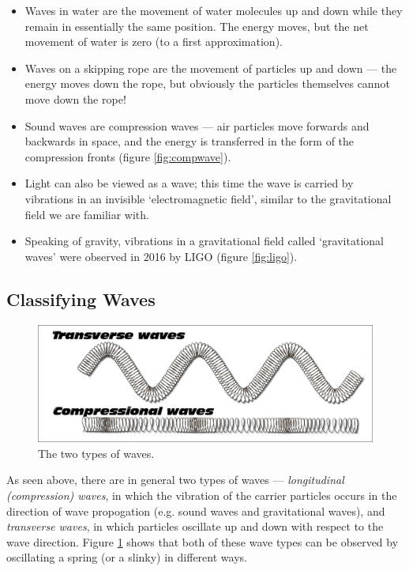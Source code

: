 \documentclass[a4paper]{amsbook}
\newcommand\capcite[1]{}
\begin{document}
\begin{itemize}
  \item Waves in water are the movement of water molecules up and down while they remain in essentially the same position.
        The energy moves, but the net movement of water is zero (to a first approximation).
  \item Waves on a skipping rope are the movement of particles up and down --- the energy moves down the rope, but obviously
        the particles themselves cannot move down the rope!
  \item Sound waves are compression waves --- air particles move forwards and backwards in space, and the energy is transferred
        in the form of the compression fronts (figure \ref{fig:compwave}).
  \item Light can also be viewed as a wave; this time the wave is carried by vibrations in an invisible `electromagnetic field', similar
        to the gravitational field we are familiar with.
  \item Speaking of gravity, vibrations in a gravitational field called `gravitational waves' were observed in 2016 by LIGO (figure \ref{fig:ligo}).
\end{itemize}

\subsection{Classifying Waves}
\begin{figure}
  \centering
  \includegraphics[width=\textwidth]{wavetypes}
  \caption{The two types of waves. \capcite{http://epiphanyvideoworks.com/Science/Hughes/Units/Energy/Energypictures/scan0010.jpg}\label{fig:wavetypes}}
\end{figure}
As seen above, there are in general two types of waves --- \textit{longitudinal (compression) waves}, in which the vibration of
the carrier particles occurs in the direction of wave propogation (e.g. sound waves and gravitational waves), and \textit{transverse waves},
in which particles oscillate up and down with respect to the wave direction. Figure \ref{fig:wavetypes} shows that both of these wave
types can be observed by oscillating a spring (or a slinky) in different ways.
\end{document}
